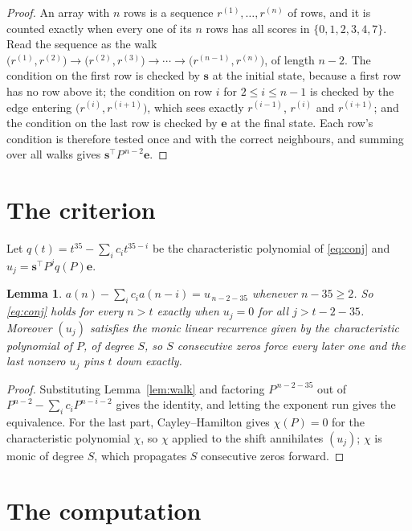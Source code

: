 \documentclass[11pt,a4paper]{article}
\theoremstyle{plain}
\newtheorem{lemma}[theorem]{Lemma}
\theoremstyle{definition}
\begin{document}
\begin{proof}
An array with $n$ rows is a sequence $r^{(1)},\dots,r^{(n)}$ of rows, and it is counted
exactly when every one of its $n$ rows has all scores in $\{0,1,2,3,4,7\}$. Read the sequence as the
walk $\bigl(r^{(1)},r^{(2)}\bigr)\to\bigl(r^{(2)},r^{(3)}\bigr)\to\cdots\to
\bigl(r^{(n-1)},r^{(n)}\bigr)$, of length $n-2$. The condition on the first row is
checked by $\mathbf{s}$ at the initial state, because a first row has no row above it; the
condition on row $i$ for $2\le i\le n-1$ is checked by the edge entering
$\bigl(r^{(i)},r^{(i+1)}\bigr)$, which sees exactly $r^{(i-1)}$, $r^{(i)}$ and
$r^{(i+1)}$; and the condition on the last row is checked by $\mathbf{e}$ at the final
state. Each row's condition is therefore tested once and with the correct neighbours, and
summing over all walks gives $\mathbf{s}^{\!\top}P^{\,n-2}\mathbf{e}$.
\end{proof}

\section{The criterion}

Let $q(t)=t^{35}-\sum_i c_i t^{35-i}$ be the characteristic polynomial of
\eqref{eq:conj} and $u_j=\mathbf{s}^{\!\top}P^{j}q(P)\mathbf{e}$.

\begin{lemma}\label{lem:crit}
$a(n)-\sum_i c_i a(n-i)=u_{\,n-2-35}$ whenever $n-35\ge2$. So \eqref{eq:conj}
holds for every $n>t$ exactly when $u_j=0$ for all $j>t-2-35$. Moreover $(u_j)$
satisfies the monic linear recurrence given by the characteristic polynomial of $P$, of
degree $S$, so $S$ consecutive zeros force every later one and the last nonzero $u_j$ pins
$t$ down exactly.
\end{lemma}

\begin{proof}
Substituting Lemma~\ref{lem:walk} and factoring $P^{\,n-2-35}$ out of
$P^{n-2}-\sum_i c_i P^{n-i-2}$ gives the identity, and letting the exponent run gives the
equivalence. For the last part, Cayley--Hamilton gives $\chi(P)=0$ for the characteristic
polynomial $\chi$, so $\chi$ applied to the shift annihilates $(u_j)$; $\chi$ is monic of
degree $S$, which propagates $S$ consecutive zeros forward.
\end{proof}

\section{The computation}
\end{document}
